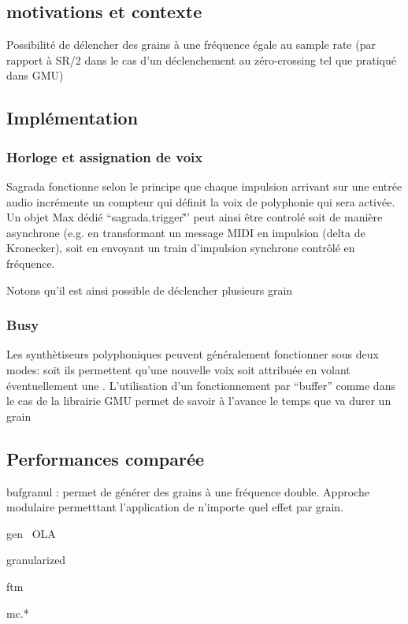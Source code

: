 \subsection{motivations et contexte}
Possibilité de délencher des grains à une fréquence égale au sample rate (par rapport à SR/2 dans le cas d'un déclenchement au zéro-crossing tel que pratiqué dans GMU)
\subsection{Implémentation}
\subsubsection{Horloge et assignation de voix}
Sagrada fonctionne selon le principe que chaque impulsion arrivant sur une entrée audio incrémente un compteur qui définit la voix de polyphonie qui sera activée. Un objet Max dédié ``sagrada.trigger\~'' peut ainsi être controlé soit de manière asynchrone (e.g. en transformant un message \gls{MIDI} en impulsion (delta de Kronecker), soit en envoyant un train d'impulsion synchrone contrôlé en fréquence.

Notons qu'il est ainsi possible de déclencher plusieurs grain

\subsubsection{Busy}
Les synthètiseurs polyphoniques peuvent généralement fonctionner sous deux modes: soit ils permettent qu'une nouvelle voix soit attribuée en volant éventuellement une .
L'utilisation d'un fonctionnement par ``buffer'' comme dans le cas de la librairie GMU permet de savoir à l'avance le temps que va durer un grain

\subsection{Performances comparée}
bufgranul : permet de générer des grains à une fréquence double. Approche modulaire permetttant l'application de n'importe quel effet par grain.

gen~ OLA

granularized

ftm

mc.*



